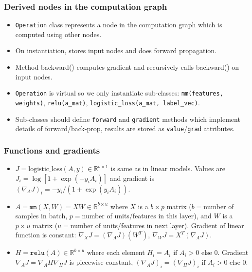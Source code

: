 \documentclass{beamer}
\begin{document}
\begin{frame}
  \frametitle{Derived nodes in the computation graph}
  \begin{itemize}
  \item \texttt{Operation} class represents a node in the computation
    graph which is computed using other nodes.
  \item On instantiation, stores input nodes and does forward
    propagation.
  \item Method backward() computes gradient and recursively calls
    backward() on input nodes.
  \item \texttt{Operation} is virtual so we only instantiate sub-classes:
    \texttt{mm(features, weights)},
    \texttt{relu(a\_mat)},
    \texttt{logistic\_loss(a\_mat, label\_vec)}.
  \item Sub-classes should define \texttt{forward} and
    \texttt{gradient} methods which implement details of
    forward/back-prop, results are stored as \texttt{value}/\texttt{grad}
    attributes.
  \end{itemize}
\end{frame}

\begin{frame}
  \frametitle{Functions and gradients}
  \begin{itemize}
  \item $J = \text{logistic\_loss}(A, y)\in\mathbb R^{b\times 1}$ is
    same as in linear models. Values are
    $J_i = \log[1+\exp(-y_i A_i)]$ and gradient is
    $(\nabla_A J)_i = -y_i/(1+\exp(y_i A_i))$.
  \item $A = \texttt{mm}(X, W) = XW \in\mathbb R^{b\times u}$ where
    $X$ is a $b \times p$ matrix ($b=$number of samples in batch,
    $p=$number of units/features in this layer), and $W$ is a
    $p \times u$ matrix ($u=$number of units/features in next
    layer). Gradient of linear function is constant:
    $\nabla_X J = (\nabla_A J) (W^T)$,
    $\nabla_W J = X^T (\nabla_A J)$.
  \item $H = \texttt{relu}(A) \in\mathbb R^{b\times u}$ where each
    element $H_i = A_i\text{ if } A_i > 0\text{ else } 0$. Gradient
    $\nabla_A J = \nabla_A H \nabla_H J$ is piecewise constant, $(\nabla_A J)_i= (\nabla_H J)_i \text{ if } A_i > 0 \text{ else } 0$.
  \end{itemize}
  
\end{frame}
\end{document}
